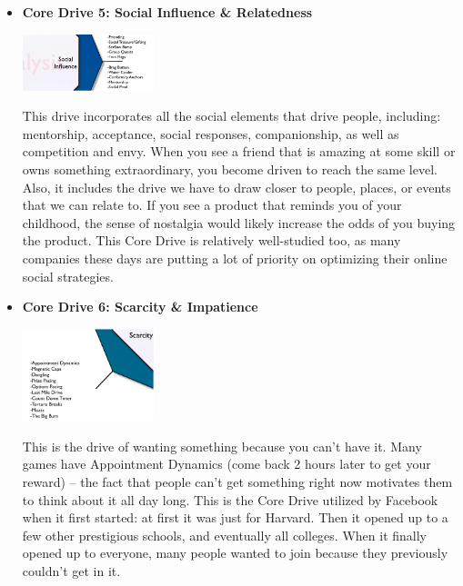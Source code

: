 \begin{itemize}
      \item \textbf{Core Drive 5: Social Influence \& Relatedness}
    \begin{center}
        \includegraphics[width= 0.3\textwidth]{images/core-drive-5-social-influence-and-relatedness.png}
    \end{center}
This drive incorporates all the social elements that drive people, including: mentorship, acceptance, social responses, companionship, as well as competition and envy. When you see a friend that is amazing at some skill or owns something extraordinary, you become driven to reach the same level. Also, it includes the drive we have to draw closer to people, places, or events that we can relate to. If you see a product that reminds you of your childhood, the sense of nostalgia would likely increase the odds of you buying the product. This Core Drive is relatively well-studied too, as many companies these days are putting a lot of priority on optimizing their online social strategies.

      \item \textbf{Core Drive 6: Scarcity \& Impatience}
    \begin{center}
        \includegraphics[width= 0.3\textwidth]{images/core-drive-6-scarcity-and-impatience.png}
    \end{center}
This is the drive of wanting something because you can’t have it. Many games have Appointment Dynamics (come back 2 hours later to get your reward) – the fact that people can’t get something right now motivates them to think about it all day long. This is the Core Drive utilized by Facebook when it first started: at first it was just for Harvard. Then it opened up to a few other prestigious schools, and eventually all colleges. When it finally opened up to everyone, many people wanted to join because they previously couldn’t get in it.


\end{itemize}
